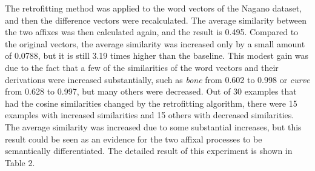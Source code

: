\documentclass[12pt]{article}
\begin{document}
    The retrofitting method was applied to the word vectors of the Nagano dataset, and then the difference vectors were recalculated. The average similarity between the two affixes was then calculated again, and the result is 0.495. Compared to the original vectors, the average similarity was increased only by a small amount of 0.0788, but it is still 3.19 times higher than the baseline. This modest gain was due to the fact that a few of the similarities of the word vectors and their derivations were increased substantially, such as \emph{bone} from 0.602 to 0.998 or \emph{curve} from 0.628 to 0.997, but many others were decreased. Out of 30 examples that had the cosine similarities changed by the retrofitting algorithm, there were 15 examples with increased similarities and 15 others with decreased similarities. The average similarity was increased due to some substantial increases, but this result could be seen as an evidence for the two affixal processes to be semantically differentiated. The detailed result of this experiment is shown in Table 2.
\end{document}
